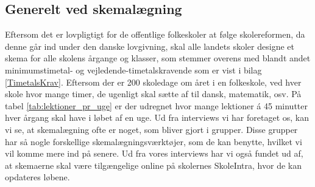 \subsection{Generelt ved skemalægning}
Eftersom det er lovpligtigt for de offentlige folkeskoler at følge skolereformen, da denne går ind under den danske lovgivning, skal alle landets skoler designe et skema for alle skolens årgange og klasser, som stemmer overens med blandt andet minimumstimetal- og vejledende-timetalskravende som er vist i bilag \ref{TimetalsKrav}. Eftersom der er 200 skoledage om året i en folkeskole\cite{elevers_timetal}, ved hver skole hvor mange timer, de ugenligt skal sætte af til dansk, matematik, osv. På tabel \ref{tab:lektioner_pr_uge} er der udregnet hvor mange lektioner \'a 45 minutter hver årgang skal have i løbet af en uge. Ud fra interviews vi har foretaget os, kan vi se, at skemalægning ofte er noget, som bliver gjort i grupper. Disse grupper har så nogle forskellige skemalægningsværktøjer, som de kan benytte, hvilket vi vil komme mere ind på senere. Ud fra vores interviews har vi også fundet ud af, at skemaerne skal være tilgængelige online på skolernes SkoleIntra, hvor de kan opdateres løbene.

